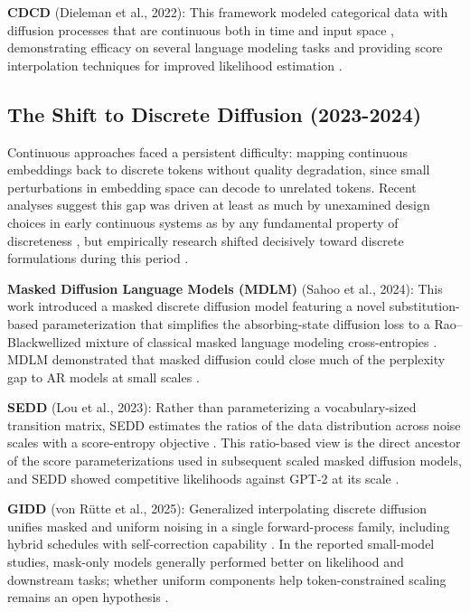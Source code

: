 \documentclass[11pt]{article}
\begin{document}
\textbf{CDCD} (Dieleman et al., 2022): This framework modeled categorical data with diffusion processes that are continuous both in time and input space \cite{dieleman2022cdcd}, demonstrating efficacy on several language modeling tasks and providing score interpolation techniques for improved likelihood estimation \cite{dieleman2022cdcd}.

\subsection{The Shift to Discrete Diffusion (2023-2024)}

Continuous approaches faced a persistent difficulty: mapping continuous embeddings back to discrete tokens without quality degradation, since small perturbations in embedding space can decode to unrelated tokens. Recent analyses suggest this gap was driven at least as much by unexamined design choices in early continuous systems as by any fundamental property of discreteness \cite{shen2026codar}, but empirically research shifted decisively toward discrete formulations during this period \cite{jin2025discreteness}.

\textbf{Masked Diffusion Language Models (MDLM)} (Sahoo et al., 2024): This work introduced a masked discrete diffusion model featuring a novel substitution-based parameterization that simplifies the absorbing-state diffusion loss to a Rao--Blackwellized mixture of classical masked language modeling cross-entropies \cite{sahoo2024simple}. MDLM demonstrated that masked diffusion could close much of the perplexity gap to AR models at small scales \cite{sahoo2024simple}.

\textbf{SEDD} (Lou et al., 2023): Rather than parameterizing a vocabulary-sized transition matrix, SEDD estimates the ratios of the data distribution across noise scales with a score-entropy objective \cite{lou2023sedd}. This ratio-based view is the direct ancestor of the score parameterizations used in subsequent scaled masked diffusion models, and SEDD showed competitive likelihoods against GPT-2 at its scale \cite{lou2023sedd}.

\textbf{GIDD} (von R\"utte et al., 2025): Generalized interpolating discrete diffusion unifies masked and uniform noising in a single forward-process family, including hybrid schedules with self-correction capability \cite{gulrajani2025gidd}. In the reported small-model studies, mask-only models generally performed better on likelihood and downstream tasks; whether uniform components help token-constrained scaling remains an open hypothesis \cite{gulrajani2025gidd}.
\end{document}
